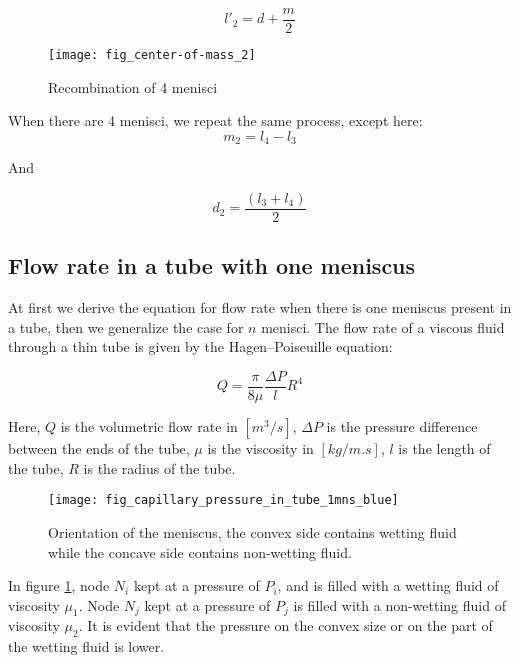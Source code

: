 	\begin{equation}
		{l'}_2 = d + \frac{m}{2}
	\end{equation}
	

	\begin{figure}[H]
		\centering
		\texttt{[image: fig\_center-of-mass\_2]}
		\caption{Recombination of 4 menisci}
	\end{figure}
	
	When there are 4 menisci, we repeat the same process, except here:
	\begin{equation}
		m_2 = l_4 - l_3
	\end{equation}
	
	And
	
	\begin{equation}	
		d_2 = \frac{(l_3 + l_4)}{2}
	\end{equation}

\subsection{Flow rate in a tube with one meniscus} \label{sec:simple-flow-rate}
	At first we derive the equation for flow rate when there is one meniscus present in a tube, then we generalize the case for $n$ menisci. The flow rate of a viscous fluid through a thin tube is given by the Hagen–Poiseuille equation:
	
	\begin{equation} \label{eq:flow-rate}
		Q = \frac{\pi}{8\mu} \frac{\Delta P}{l} R^4
	\end{equation}
	
	Here, $Q$ is the volumetric flow rate in $[m^3/s]$, $\Delta P$ is the pressure difference between the ends of the tube, $\mu$ is the viscosity in $[kg/m.s]$, $l$ is the length of the tube, $R$ is the radius of the tube.
	
	\begin{figure}[H]
		\centering
		\texttt{[image: fig\_capillary\_pressure\_in\_tube\_1mns\_blue]}
		\caption{Orientation of the meniscus, the convex side contains wetting fluid while the concave side contains non-wetting fluid.}
		\label{fig_capillary_pressure_in_tube_1mns_blue}
	\end{figure}
	
	In figure \ref{fig_capillary_pressure_in_tube_1mns_blue}, node $N_{i}$ kept at a pressure of $P_{i}$, and is filled with a wetting fluid of viscosity $\mu_{1}$. Node $N_{j}$ kept at a pressure of $P_{j}$ is filled with a non-wetting fluid of viscosity $\mu_{2}$. It is evident that the pressure on the convex size or on the part of the wetting fluid is lower.
	
